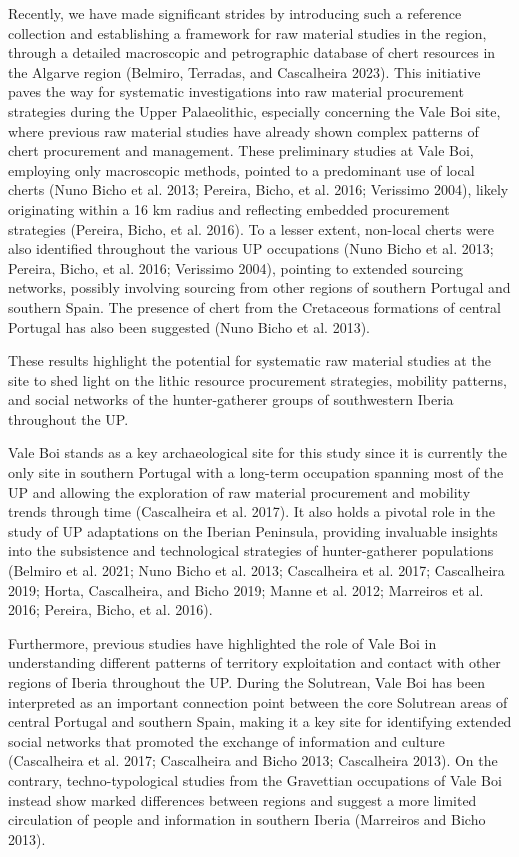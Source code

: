 \documentclass[
  a4paper,
  DIV=11,
  numbers=noendperiod]{scrreprt}
\begin{document}
Recently, we have made significant strides by introducing such a
reference collection and establishing a framework for raw material
studies in the region, through a detailed macroscopic and petrographic
database of chert resources in the Algarve region (Belmiro, Terradas,
and Cascalheira 2023). This initiative paves the way for systematic
investigations into raw material procurement strategies during the Upper
Palaeolithic, especially concerning the Vale Boi site, where previous
raw material studies have already shown complex patterns of chert
procurement and management. These preliminary studies at Vale Boi,
employing only macroscopic methods, pointed to a predominant use of
local cherts (Nuno Bicho et al. 2013; Pereira, Bicho, et al. 2016;
Verissimo 2004), likely originating within a 16 km radius and reflecting
embedded procurement strategies (Pereira, Bicho, et al. 2016). To a
lesser extent, non-local cherts were also identified throughout the
various UP occupations (Nuno Bicho et al. 2013; Pereira, Bicho, et al.
2016; Verissimo 2004), pointing to extended sourcing networks, possibly
involving sourcing from other regions of southern Portugal and southern
Spain. The presence of chert from the Cretaceous formations of central
Portugal has also been suggested (Nuno Bicho et al. 2013).

These results highlight the potential for systematic raw material
studies at the site to shed light on the lithic resource procurement
strategies, mobility patterns, and social networks of the
hunter-gatherer groups of southwestern Iberia throughout the UP.

Vale Boi stands as a key archaeological site for this study since it is
currently the only site in southern Portugal with a long-term occupation
spanning most of the UP and allowing the exploration of raw material
procurement and mobility trends through time (Cascalheira et al. 2017).
It also holds a pivotal role in the study of UP adaptations on the
Iberian Peninsula, providing invaluable insights into the subsistence
and technological strategies of hunter-gatherer populations (Belmiro et
al. 2021; Nuno Bicho et al. 2013; Cascalheira et al. 2017; Cascalheira
2019; Horta, Cascalheira, and Bicho 2019; Manne et al. 2012; Marreiros
et al. 2016; Pereira, Bicho, et al. 2016).

Furthermore, previous studies have highlighted the role of Vale Boi in
understanding different patterns of territory exploitation and contact
with other regions of Iberia throughout the UP. During the Solutrean,
Vale Boi has been interpreted as an important connection point between
the core Solutrean areas of central Portugal and southern Spain, making
it a key site for identifying extended social networks that promoted the
exchange of information and culture (Cascalheira et al. 2017;
Cascalheira and Bicho 2013; Cascalheira 2013). On the contrary,
techno-typological studies from the Gravettian occupations of Vale Boi
instead show marked differences between regions and suggest a more
limited circulation of people and information in southern Iberia
(Marreiros and Bicho 2013).
\end{document}
